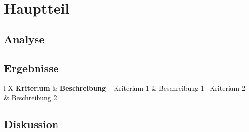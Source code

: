 \section{Hauptteil}
\label{sec:hauptteil}
\subsection{Analyse}
\label{subsec:analyse}
\subsection{Ergebnisse}
\label{subsec:ergebnisse}
\begin{table}[H]
    \centering
    \renewcommand{\arraystretch}{1.3}
    \begin{tabularx}{\textwidth}{l X}
        \toprule
        \textbf{Kriterium} & \textbf{Beschreibung} \
        \midrule
        Kriterium 1 & Beschreibung 1 \
        Kriterium 2 & Beschreibung 2 \
        \bottomrule
    \end{tabularx}
    \caption{TODO: Tabellenunterschrift}
    \label{tab:beispiel}
\end{table}
\subsection{Diskussion}
\label{subsec:diskussion}
